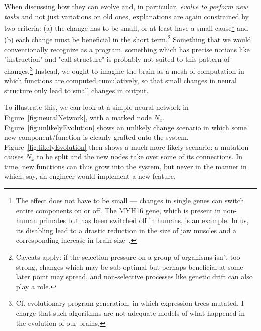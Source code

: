 When discussing how they can evolve and, in particular, {\em evolve to perform new tasks} and not just variations on old ones, explanations are again constrained by two criteria: (a) the change has to be small, or at least have a small cause\footnote{The effect does not have to be small --- changes in single genes can switch entire components on or off. The MYH16 gene, which is present in non-human primates but has been switched off in humans, is an example. In us, its disabling lead to a drastic reduction in the size of jaw muscles and a corresponding increase in brain size~\cite{carroll2005}.} and (b) each change must be beneficial in the short term.\footnote{Caveats apply: if the selection pressure on a group of organisms isn't too strong, changes which may be sub-optimal but perhaps beneficial at some later point may spread, and non-selective processes like genetic drift can also play a role.} Something that we would conventionally recognize as a program, something which has precise notions like "instruction" and "call structure" is probably not suited to this pattern of changes.\footnote{Cf. evolutionary program generation, in which expression trees mutated. I charge that such algorithms are not adequate models of what happened in the evolution of our brains.} Instead, we ought to imagine the brain as a mesh of computation in which functions are computed cumulatively, so that small changes in neural structure only lead to small changes in output.

To illustrate this, we can look at a simple neural network in Figure~\ref{fig:neuralNetwork}, with a marked node $N_x$. Figure~\ref{fig:unlikelyEvolution} shows an unlikely change scenario in which some new component/function is cleanly grafted onto the system. Figure~\ref{fig:likelyEvolution} then shows a much more likely scenario: a mutation causes $N_x$ to be split and the new nodes take over some of its connections. In time, new functions can thus grow into the system, but never in the manner in which, say, an engineer would implement a new feature.

